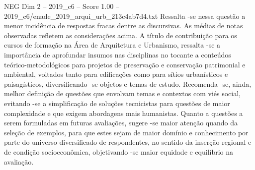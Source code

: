 \begin{textsample}{NEG Dim 2 – 2019\_c6 – Score 1.00 – 2019\_c6/enade\_2019\_arqui\_urb\_213c4ab7d4.txt}
Ressalta -se nessa questão a menor incidência de respostas fracas dentre as discursivas.
As médias de notas observadas refletem as considerações acima.
A título de contribuição para os cursos de formação na Área de Arquitetura e Urbanismo, ressalta -se a importância de aprofundar insumos nas disciplinas no tocante a conteúdos teórico-metodológicos para projetos de preservação e conservação patrimonial e ambiental, voltados tanto para edificações como para sítios urbanísticos e paisagísticos, diversificando -se objetos e temas de estudo.
Recomenda -se, ainda, melhor definição de questões que envolvam temas e contextos com viés social, evitando -se a simplificação de soluções tecnicistas para questões de maior complexidade e que exigem abordagens mais humanistas.
Quanto a questões a serem formuladas em futuras avaliações, sugere -se maior atenção quando da seleção de exemplos, para que estes sejam de maior domínio e conhecimento por parte do universo diversificado de respondentes, no sentido da inserção regional e de condição socioeconômica, objetivando -se maior equidade e equilíbrio na avaliação.

\end{textsample}
